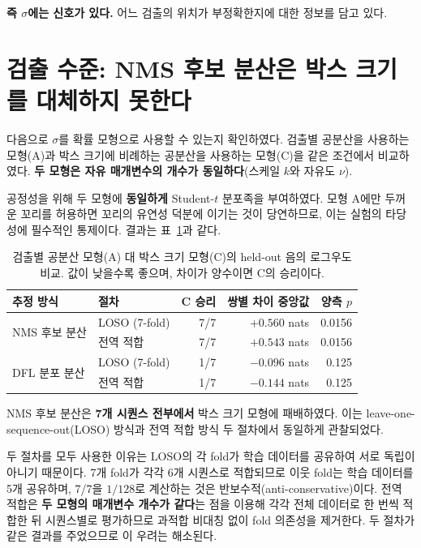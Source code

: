\documentclass[12pt,a4paper,oneside]{report}
\begin{document}
\textbf{즉 $\sigma$에는 신호가 있다.} 어느 검출의 위치가 부정확한지에 대한 정보를 담고 있다.

\section{검출 수준: NMS 후보 분산은 박스 크기를 대체하지 못한다}\label{sec:5-2}

다음으로 $\sigma$를 확률 모형으로 사용할 수 있는지 확인하였다. 검출별 공분산을 사용하는 모형(A)과 박스 크기에 비례하는 공분산을 사용하는 모형(C)을 같은 조건에서 비교하였다. \textbf{두 모형은 자유 매개변수의 개수가 동일하다}(스케일 $k$와 자유도 $\nu$).

공정성을 위해 두 모형에 \textbf{동일하게} Student-$t$ 분포족을 부여하였다. 모형 A에만 두꺼운 꼬리를 허용하면 꼬리의 유연성 덕분에 이기는 것이 당연하므로, 이는 실험의 타당성에 필수적인 통제이다. 결과는 표~\ref{tab:nll}과 같다.

\begin{table}[htbp]
\centering
\small
\caption{검출별 공분산 모형(A) 대 박스 크기 모형(C)의 held-out 음의 로그우도 비교. 값이 낮을수록 좋으며, 차이가 양수이면 C의 승리이다.}
\label{tab:nll}
\begin{tabular}{llrrr}
\toprule
\textbf{추정 방식} & 절차 & C 승리 & 쌍별 차이 중앙값 & 양측 $p$ \\
\midrule
\multirow{2}{*}{NMS 후보 분산} & LOSO (7-fold) & 7/7 & $+0.560$ nats & 0.0156 \\
                              & 전역 적합      & 7/7 & $+0.543$ nats & 0.0156 \\
\midrule
\multirow{2}{*}{DFL 분포 분산} & LOSO (7-fold) & 1/7 & $-0.096$ nats & 0.125 \\
                              & 전역 적합      & 1/7 & $-0.144$ nats & 0.125 \\
\bottomrule
\end{tabular}
\end{table}

NMS 후보 분산은 \textbf{7개 시퀀스 전부에서} 박스 크기 모형에 패배하였다. 이는 leave-one-sequence-out(LOSO) 방식과 전역 적합 방식 두 절차에서 동일하게 관찰되었다.

두 절차를 모두 사용한 이유는 LOSO의 각 fold가 학습 데이터를 공유하여 서로 독립이 아니기 때문이다. 7개 fold가 각각 6개 시퀀스로 적합되므로 이웃 fold는 학습 데이터를 5개 공유하며, 7/7을 $1/128$로 계산하는 것은 반보수적(anti-conservative)이다. 전역 적합은 \textbf{두 모형의 매개변수 개수가 같다}는 점을 이용해 각각 전체 데이터로 한 번씩 적합한 뒤 시퀀스별로 평가하므로 과적합 비대칭 없이 fold 의존성을 제거한다. 두 절차가 같은 결과를 주었으므로 이 우려는 해소된다.
\end{document}
